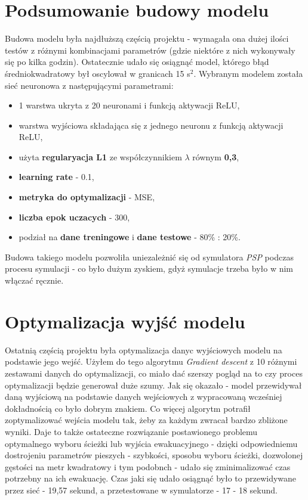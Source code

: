 \documentclass[12pt]{aghdpl}
\begin{document}
		\section{Podsumowanie budowy modelu}
		Budowa modelu była najdłuższą częścią projektu - wymagała ona dużej ilości testów z różnymi kombinacjami parametrów (gdzie niektóre z nich wykonywały się po kilka godzin). Ostatecznie udało się osiągnąć model, którego błąd średniokwadratowy był oscylował w granicach 15 s$^2$. Wybranym modelem została sieć neuronowa z następującymi parametrami:
		\begin{itemize}
		\item 1 warstwa ukryta z 20 neuronami i funkcją aktywacji ReLU,
		\item warstwa wyjściowa składająca się z jednego neuronu z funkcją aktywacji ReLU,
		\item użyta \textbf{regularyacja L1} ze współczynnikiem $\lambda$ równym \textbf{0,3},
		\item \textbf{learning rate} - 0.1,
		\item \textbf{metryka do optymalizacji} - MSE,
		\item \textbf{liczba epok uczacych} - 300,
		\item podział na \textbf{dane treningowe} i \textbf{dane testowe} - 80\% : 20\%.
		\end{itemize}
		
		Budowa takiego modelu pozwoliła uniezależnić się od symulatora \textit{PSP} podczas procesu symulacji - co było dużym zyskiem, gdyż symulacje trzeba było w nim włączać ręcznie.
		
		\section{Optymalizacja wyjść modelu}
		Ostatnią częścią projektu była optymalizacja danyc wyjściowych modelu na podstawie jego wejść. Użyłem do tego algorytmu \textit{Gradient descent} z 10 różnymi zestawami danych do optymalizacji, co miało dać szerszy pogląd na to czy proces optymalizacji będzie generował duże szumy. Jak się okazało - model przewidywał daną wyjściową na podstawie danych wejściowych z wypracowaną wcześniej dokładnością co było dobrym znakiem. Co więcej algorytm potrafił zoptymalizować wejścia modelu tak, żeby za każdym zwracał bardzo zbliżone wyniki. Daje to także ostateczne rozwiązanie postawionego problemu optymalnego wyboru ścieżki lub wyjścia ewakuacyjnego - dzięki odpowiedniemu dostrojeniu parametrów pieszych - szybkości, sposobu wyboru ścieżki, dozwolonej gęstości na metr kwadratowy i tym podobnch - udało się zminimalizować czas potrzebny na ich ewakuację. Czas jaki się udało osiągnąć było to przewidywane przez sieć - 19,57 sekund, a przetestowane w symulatorze - 17 - 18 sekund.
		
	\printbibliography
\end{document}

